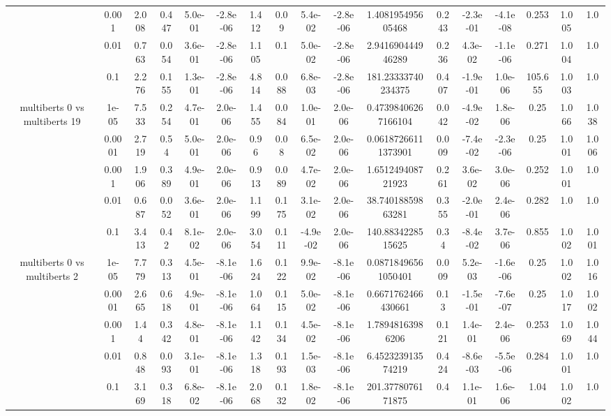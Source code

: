 \begin{tabular}{|c|c|c|c|c|c|c|c|c|c|c|c|c|c|c|c|c|}
 & 0.001 & 2.008 & 0.447 & 5.0e-01 & -2.8e-06 & 1.412 & 0.09 & 5.4e-02 & -2.8e-06 & 1.408195495605468 & 0.243 & -2.3e-01 & -4.1e-08 & 0.253 & 1.005 & 1.0 \\
 & 0.01 & 0.763 & 0.054 & 3.6e-01 & -2.8e-06 & 1.105 & 0.1 & 5.0e-02 & -2.8e-06 & 2.941690444946289 & 0.236 & 4.3e-02 & -1.1e-06 & 0.271 & 1.004 & 1.0 \\
 & 0.1 & 2.276 & 0.155 & 1.3e-01 & -2.8e-06 & 4.814 & 0.088 & 6.8e-03 & -2.8e-06 & 181.23333740234375 & 0.407 & -1.9e-01 & 1.0e-06 & 105.655 & 1.003 & 1.0 \\
\hline
\multirow{5}{*}{multiberts 0 vs multiberts 19} & 1e-05 & 7.533 & 0.254 & 4.7e-01 & 2.0e-06 & 1.455 & 0.084 & 1.0e-01 & 2.0e-06 & 0.47398406267166104 & 0.042 & -4.9e-02 & 1.8e-06 & 0.25 & 1.066 & 1.038 \\
 & 0.0001 & 2.719 & 0.54 & 5.0e-01 & 2.0e-06 & 0.96 & 0.08 & 6.5e-02 & 2.0e-06 & 0.06187266111373901 & 0.009 & -7.4e-02 & -2.3e-06 & 0.25 & 1.001 & 1.006 \\
 & 0.001 & 1.906 & 0.389 & 4.9e-01 & 2.0e-06 & 0.913 & 0.089 & 4.7e-02 & 2.0e-06 & 1.651249408721923 & 0.261 & 3.6e-02 & 3.0e-06 & 0.252 & 1.001 & 1.0 \\
 & 0.01 & 0.687 & 0.052 & 3.6e-01 & 2.0e-06 & 1.199 & 0.175 & 3.1e-02 & 2.0e-06 & 38.74018859863281 & 0.355 & -2.0e-01 & 2.4e-06 & 0.282 & 1.0 & 1.0 \\
 & 0.1 & 3.413 & 0.42 & 8.1e-02 & 2.0e-06 & 3.054 & 0.111 & -4.9e-02 & 2.0e-06 & 140.8834228515625 & 0.34 & -8.4e-02 & 3.7e-06 & 0.855 & 1.002 & 1.001 \\
\hline
\multirow{5}{*}{multiberts 0 vs multiberts 2} & 1e-05 & 7.779 & 0.313 & 4.5e-01 & -8.1e-06 & 1.624 & 0.122 & 9.9e-02 & -8.1e-06 & 0.08718496561050401 & 0.009 & 5.2e-03 & -1.6e-06 & 0.25 & 1.002 & 1.016 \\
 & 0.0001 & 2.665 & 0.618 & 4.9e-01 & -8.1e-06 & 1.064 & 0.115 & 5.0e-02 & -8.1e-06 & 0.6671762466430661 & 0.13 & -1.5e-01 & -7.6e-07 & 0.25 & 1.017 & 1.002 \\
 & 0.001 & 1.44 & 0.342 & 4.8e-01 & -8.1e-06 & 1.142 & 0.134 & 4.5e-02 & -8.1e-06 & 1.78948163986206 & 0.121 & 1.4e-01 & 2.4e-06 & 0.253 & 1.069 & 1.044 \\
 & 0.01 & 0.848 & 0.093 & 3.1e-01 & -8.1e-06 & 1.318 & 0.193 & 1.5e-03 & -8.1e-06 & 6.452323913574219 & 0.424 & -8.6e-03 & -5.5e-06 & 0.284 & 1.001 & 1.0 \\
 & 0.1 & 3.169 & 0.318 & 6.8e-02 & -8.1e-06 & 2.068 & 0.132 & 1.8e-02 & -8.1e-06 & 201.3778076171875 & 0.4 & 1.1e-01 & 1.6e-06 & 1.04 & 1.002 & 1.0 \\

\end{tabular}
